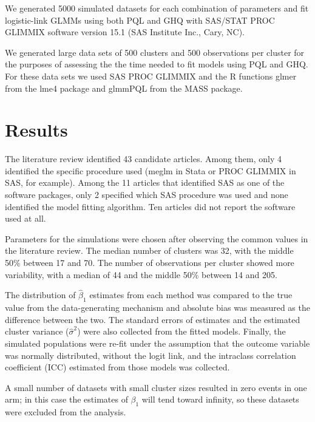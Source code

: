 \documentclass[Afour,times,sagev,doublespace]{sagej}
\begin{document}
We generated 5000 simulated datasets for each combination of parameters and fit logistic-link GLMMs using both PQL and GHQ with SAS/STAT PROC GLIMMIX software version 15.1 (SAS Institute Inc., Cary, NC).

We generated large data sets of 500 clusters and 500 observations per cluster for the purposes of assessing the the time needed to fit models using PQL and GHQ.  For these data sets we used SAS PROC GLIMMIX and the R functions glmer from the lme4 package and glmmPQL from the MASS package.






\section{Results}

The literature review identified 43 candidate articles. Among them, only 4 identified the specific procedure used (meglm in Stata or PROC GLIMMIX in SAS, for example). Among the 11 articles that identified SAS as one of the software packages, only 2 specified which SAS procedure was used and none identified the model fitting algorithm. Ten articles did not report the software used at all.

Parameters for the simulations were chosen after observing the common values in the literature review. The median number of clusters was 32, with the middle 50\% between 17 and 70. The number of observations per cluster showed more variability, with a median of 44 and the middle 50\% between 14 and 205.


The distribution of $\hat{\beta}_1$ estimates from each method was compared to the true value from the data-generating mechanism and absolute bias was measured as the difference between the two. The standard errors of estimates and the estimated cluster variance ($\hat{\sigma}^2$) were also collected from the fitted models. Finally, the simulated populations were re-fit under the assumption that the outcome variable was normally distributed, without the logit link, and the intraclass correlation coefficient (ICC) estimated from those models was collected.

A small number of datasets with small cluster sizes resulted in zero events in one arm; in this case the estimates of $\beta_1$ will tend toward infinity, so these datasets were excluded from the analysis.
\end{document}
